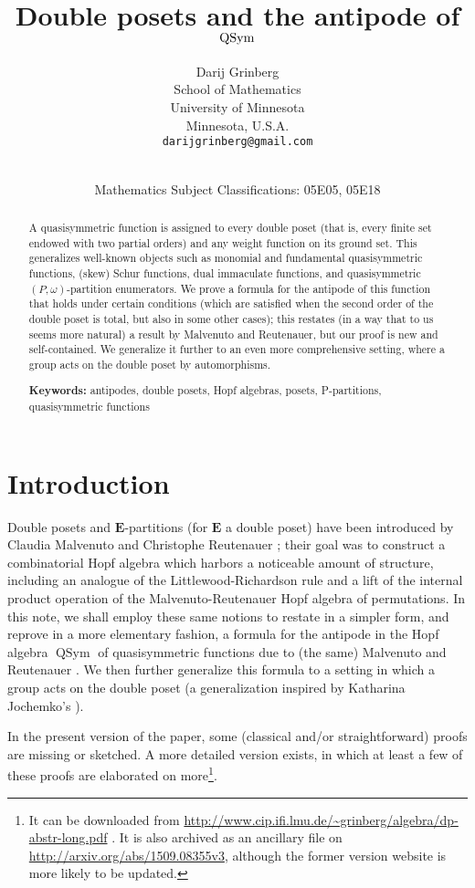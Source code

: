 \documentclass[12pt]{article}
\title{Double posets and the antipode of $\QSym$}
\author{Darij Grinberg\\
\small School of Mathematics\\[-0.8ex]
\small University of Minnesota\\[-0.8ex]
\small Minnesota, U.S.A.\\
\small\tt darijgrinberg@gmail.com}
\date{\dateline{Apr 13, 2017}{Apr 13, 2017}\\
\small Mathematics Subject Classifications: 05E05, 05E18}
\theoremstyle{plain}
\theoremstyle{definition}
\theoremstyle{remark}
\newcommand{\QSym}{{\operatorname{QSym}}}
\newcommand{\EE}{{\mathbf{E}}}
\begin{document}
\maketitle

\begin{abstract}
  A quasisymmetric function is assigned to every double poset (that is,
  every finite set endowed with two partial orders) and any weight function
  on its ground set. This generalizes well-known objects such as monomial
  and fundamental quasisymmetric functions, (skew) Schur functions, dual
  immaculate functions, and quasisymmetric
  $\left(P, \omega\right)$-partition enumerators.
  We prove a formula for the antipode of this function that
  holds under certain conditions (which are satisfied when the second order
  of the double poset is total, but also in some other cases); this
  restates (in a way that to us seems more natural) a
  result by Malvenuto and Reutenauer, but our proof is new and
  self-contained. We generalize it further to an even more comprehensive
  setting, where a group acts on the double poset by automorphisms.
  
  \bigskip\noindent \textbf{Keywords:} antipodes, double posets, Hopf
  algebras, posets, P-partitions, quasisymmetric functions
\end{abstract}

\section{Introduction}
\label{sec:in}

Double posets and $\EE$-partitions (for $\EE$ a double poset)
have been introduced by Claudia Malvenuto and Christophe
Reutenauer \cite{Mal-Reu-DP}; their goal was to construct a
combinatorial Hopf algebra which harbors a noticeable amount of
structure, including an analogue of the Littlewood-Richardson
rule and a lift of the internal product operation of the
Malvenuto-Reutenauer Hopf algebra of permutations. In this note,
we shall employ these same notions to restate in a simpler form,
and reprove in a more elementary fashion, a formula for the
antipode in the Hopf algebra $\QSym$ of quasisymmetric functions
due to (the same) Malvenuto and Reutenauer
\cite[Theorem 3.1]{Mal-Reu}. We then further generalize this
formula to a setting in which a group acts on the double poset
(a generalization inspired by Katharina Jochemko's
\cite{Joch}).

In the present version of the paper, some (classical and/or
straightforward) proofs are missing or sketched. A more detailed
version exists, in which at least a few of these proofs are
elaborated on more\footnote{It can be downloaded from
\url{http://www.cip.ifi.lmu.de/~grinberg/algebra/dp-abstr-long.pdf} .
It is also archived as an ancillary file on
\url{http://arxiv.org/abs/1509.08355v3}, although the former version
website is more likely to be updated.}.
\end{document}
